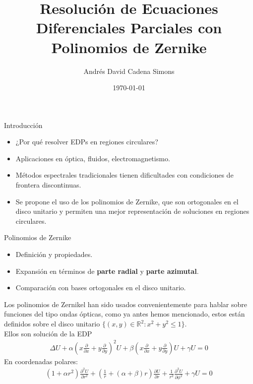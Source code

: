 \documentclass{beamer}
\title{Resolución de Ecuaciones Diferenciales Parciales con Polinomios de Zernike}
\author{Andrés David Cadena Simons}
\institute{Universidad Nacional de Colombia}
\date{\today}
\begin{document}
\begin{frame}
    \titlepage
\end{frame}

\begin{frame}{Introducción}
    \begin{itemize}
        \item ¿Por qué resolver EDPs en regiones circulares?
        \item Aplicaciones en óptica, fluidos, electromagnetismo.
        \item Métodos espectrales tradicionales tienen dificultades con condiciones de frontera discontinuas.
        \item Se propone el uso de los polinomios de Zernike, que son ortogonales en el disco unitario y permiten una mejor representación de soluciones en regiones circulares.
    \end{itemize}
    \cite{Datta2022}
\end{frame}

\begin{frame}{Polinomios de Zernike}
    \begin{itemize}
        \item Definición y propiedades.
        \item Expansión en términos de \textbf{parte radial} y \textbf{parte azimutal}.
        \item Comparación con bases ortogonales en el disco unitario.
    \end{itemize}
\end{frame}

\begin{frame}
  Los polinomios de Zernikel han sido usados convenientemente para hablar sobre funciones del tipo ondas ópticas, como ya antes hemos mencionado, estos están definidos sobre el disco unitario $\{(x,y)\in \mathbb{R}^{2}: x^2+y^2\leq 1\}$.\\
  Ellos son solución de la EDP
  \begin{align*}
    \Delta U+\alpha\left( x\frac{\partial }{\partial x}+y\frac{\partial }{\partial y} \right)^2U+\beta\left( x\frac{\partial }{\partial x}+y\frac{\partial }{\partial y} \right)U+\gamma U=0
  \end{align*}
  En coordenadas polares:
  \begin{align*}
    (1+\alpha r^2)\frac{\partial^2 U}{\partial r^2}+\left( \frac{1}{r}+(\alpha+\beta)r \right)\frac{\partial U}{\partial r}+\frac{1}{r^2}\frac{\partial ^2U}{\partial \phi^2}+\gamma U=0
  \end{align*}
\end{frame}
\end{document}
